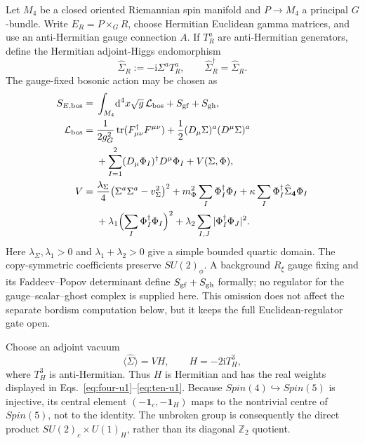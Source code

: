 \documentclass[11pt]{article}
\theoremstyle{definition}
\theoremstyle{remark}
\newcommand{\dd}{\mathrm d}
\newcommand{\ii}{\mathrm i}
\newcommand{\ZZ}{\mathbb Z}
\newcommand{\tr}{\operatorname{tr}}
\begin{document}
Let \(M_4\) be a closed oriented Riemannian spin manifold and
\(P\to M_4\) a principal \(G\)-bundle.  Write
\(E_R=P\times_G R\), choose Hermitian Euclidean gamma matrices, and use an
anti-Hermitian gauge connection \(A\).  If \(T_R^a\) are anti-Hermitian
generators, define the Hermitian adjoint-Higgs endomorphism
\begin{equation}
 \widehat\Sigma_R:=-\ii\Sigma^aT_R^a,
 \qquad \widehat\Sigma_R^\dagger=\widehat\Sigma_R.
 \label{eq:sigma-hat}
\end{equation}
The gauge-fixed bosonic action may be chosen as
\begin{align}
 S_{E,{\rm bos}}={}&\int_{M_4}\!\dd^4x\sqrt g\,
 \mathcal L_{\rm bos}+S_{\rm gf}+S_{\rm gh},
 \label{eq:bosonic-action}\\
 \mathcal L_{\rm bos}={}&
 \frac1{2g_G^2}\tr(F_{\mu\nu}^\dagger F^{\mu\nu})
 +\frac12(D_\mu\Sigma)^a(D^\mu\Sigma)^a
 \notag\\
 &
 +\sum_{I=1}^2(D_\mu\Phi_I)^\dagger D^\mu\Phi_I
 +V(\Sigma,\Phi),
 \label{eq:bosonic-density}\\
 V={}&\frac{\lambda_\Sigma}{4}
   \bigl(\Sigma^a\Sigma^a-v_\Sigma^2\bigr)^2
 +m_\Phi^2\sum_I\Phi_I^\dagger\Phi_I
 +\kappa\sum_I\Phi_I^\dagger\widehat\Sigma_{\bm4}\Phi_I
 \notag\\
 &+\lambda_1\Bigl(\sum_I\Phi_I^\dagger\Phi_I\Bigr)^2
 +\lambda_2\sum_{I,J}|\Phi_I^\dagger\Phi_J|^2.
 \label{eq:potential}
\end{align}
Here \(\lambda_\Sigma,\lambda_1>0\) and
\(\lambda_1+\lambda_2>0\) give a simple bounded quartic domain.  The
copy-symmetric coefficients preserve \(SU(2)_\phi\).  A background
\(R_\xi\) gauge fixing and its Faddeev--Popov determinant define
\(S_{\rm gf}+S_{\rm gh}\) formally; no regulator for the
gauge--scalar--ghost complex is supplied here.  This omission does not
affect the separate bordism computation below, but it keeps the full
Euclidean-regulator gate open.

Choose an adjoint vacuum
\begin{equation}
 \langle\widehat\Sigma\rangle=V H,
 \qquad H=-2\ii T_H^3,
 \label{eq:adjoint-vev}
\end{equation}
where \(T_H^3\) is anti-Hermitian.  Thus \(H\) is Hermitian and has the
real weights displayed in
Eqs.~\eqref{eq:four-u1}--\eqref{eq:ten-u1}.  Because
\(Spin(4)\hookrightarrow Spin(5)\) is injective, its central element
\((-\bm1_c,-\bm1_H)\) maps to the nontrivial centre of \(Spin(5)\), not to
the identity.  The unbroken group is consequently the direct product
\(SU(2)_c\times U(1)_H\), rather than its diagonal \(\ZZ_2\) quotient.
\end{document}
